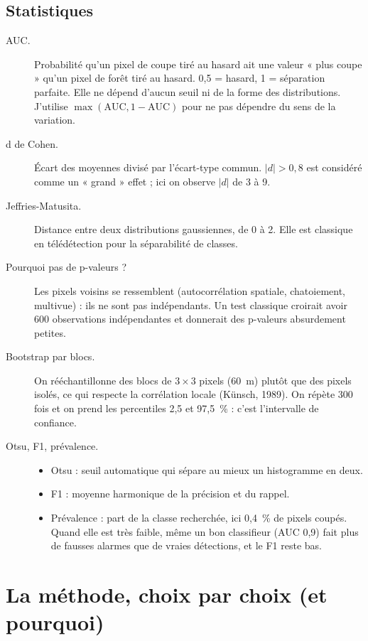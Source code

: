 \documentclass[11pt,a4paper]{article}
\begin{document}
\subsection{Statistiques}
\begin{description}
\item[AUC.] Probabilité qu'un pixel de coupe tiré au hasard ait une valeur « plus coupe » qu'un pixel de forêt tiré
  au hasard. 0,5 = hasard, 1 = séparation parfaite. Elle ne dépend d'aucun seuil ni de la forme des distributions.
  J'utilise $\max(\mathrm{AUC},1-\mathrm{AUC})$ pour ne pas dépendre du sens de la variation.
\item[d de Cohen.] Écart des moyennes divisé par l'écart-type commun. $|d|>0{,}8$ est considéré comme un « grand »
  effet ; ici on observe $|d|$ de 3 à 9.
\item[Jeffries-Matusita.] Distance entre deux distributions gaussiennes, de 0 à 2. Elle est classique en
  télédétection pour la séparabilité de classes.
\item[Pourquoi pas de p-valeurs ?] Les pixels voisins se ressemblent (autocorrélation spatiale, chatoiement, multivue) :
  ils ne sont pas indépendants. Un test classique croirait avoir 600 observations indépendantes et donnerait des
  p-valeurs absurdement petites.
\item[Bootstrap par blocs.] On rééchantillonne des blocs de $3\times3$ pixels (60~m) plutôt que des pixels isolés, ce
  qui respecte la corrélation locale (Künsch, 1989). On répète 300 fois et on prend les percentiles 2,5 et 97,5~\% :
  c'est l'intervalle de confiance.
\item[Otsu, F1, prévalence.]
  \begin{itemize}
  \item Otsu : seuil automatique qui sépare au mieux un histogramme en deux.
  \item F1 : moyenne harmonique de la précision et du rappel.
  \item Prévalence : part de la classe recherchée, ici 0,4~\% de pixels coupés. Quand elle est très faible, même un
    bon classifieur (AUC 0,9) fait plus de fausses alarmes que de vraies détections, et le F1 reste bas.
  \end{itemize}
\end{description}

\section{La méthode, choix par choix (et pourquoi)}
\end{document}
